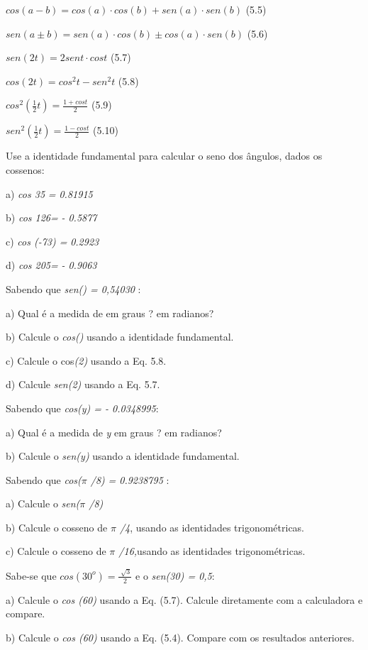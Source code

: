  \( cos \left( a-b \right) =cos \left( a \right)  \cdot cos \left( b \right) +sen \left( a \right)  \cdot sen \left( b \right)  \) \qquad (5.5)

 \( sen \left( a \pm b \right) =sen \left( a \right)  \cdot cos \left( b \right)  \pm cos \left( a \right)  \cdot sen \left( b \right)  \) \qquad (5.6)

 \( sen \left( 2t \right) =2sent \cdot cost \) \qquad (5.7)

 \( cos \left( 2t \right) =cos^{2}t-sen^{2}t \) \qquad (5.8)

 \( cos^{2} \left( \frac{1}{2}t \right) =\frac{1+cost}{2}  \) \qquad (5.9)

 \( sen^{2} \left( \frac{1}{2}t \right) =\frac{1-cost}{2}  \) \qquad (5.10)

\begin{exercicios}
\item Use a identidade fundamental para calcular o seno dos ângulos, dados os cossenos:

    a) \textit{cos 35\degree} \textit{= 0.81915}

    b) \textit{cos 126\degree =} \textit{- 0.5877}

    c) \textit{cos (-73\degree) =} \textit{0.2923}

    d) \textit{cos 205\degree =} \textit{- 0.9063}

\exitem{} Sabendo que \textit{sen() =  0,54030} :

    a) Qual é a medida de   em graus ? em radianos?

    b) Calcule o  \textit{cos()} usando a identidade fundamental.

    c) Calcule o cos\textit{(2) } usando a Eq. 5.8.

    d) Calcule  \textit{sen(2) }usando a Eq. 5.7.

\exitem{} Sabendo que \textit{cos(y) = - 0.0348995}:

    a) Qual é a medida de \textit{y } em graus ? em radianos?

    b) Calcule o  \textit{sen(y)} usando a identidade fundamental.

\exitem{} Sabendo que \textit{cos($ \pi $ /8)} \textit{= 0.9238795} :

a) Calcule o \textit{sen($ \pi $ /8)}

b) Calcule o cosseno de \textit{$ \pi $ /4}, usando as identidades trigonométricas.

c) Calcule o cosseno de \textit{$ \pi $ /16,}usando as identidades trigonométricas.

\item Sabe-se que  \( cos \left( 30^{o} \right) =\frac{\sqrt[]{3}}{2} \)     e o \textit{sen(30\degree ) = 0,5}:

a) Calcule o \textit{cos (60\degree)} usando a Eq. (5.7). Calcule diretamente com a calculadora e compare.

b)  Calcule o \textit{cos (60\degree)} usando a Eq. (5.4). Compare com os resultados anteriores.
\end{exercicios}


